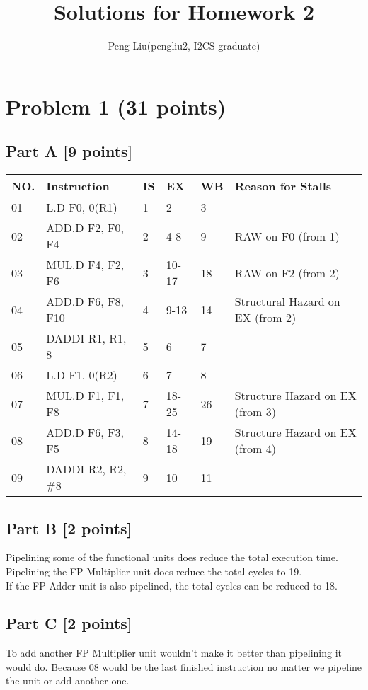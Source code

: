 \documentclass[11pt,leqno]{article}
\author{Peng Liu(pengliu2, I2CS graduate)}
\title{Solutions for Homework 2}
\begin{document}
\maketitle
\section*{Problem 1 (31 points)}
\subsection*{Part A [9 points]} 
\begin{tabular}{|l | l | l | l | l | l |}
  \hline
  NO.& Instruction      & IS    & EX    & WB    & Reason for Stalls\\
  \hline
  01 & L.D F0, 0(R1)    & 1     & 2     & 3     & \\
  \hline
  02 & ADD.D F2, F0, F4 & 2     & 4-8   & 9     & RAW on F0 (from 1)\\
  \hline
  03 & MUL.D F4, F2, F6 & 3     & 10-17  & 18    & RAW on F2 (from 2)\\
  \hline
  04 & ADD.D F6, F8, F10& 4     & 9-13  & 14    & Structural Hazard on EX (from 2)\\
  \hline
  05 & DADDI R1, R1, 8  & 5     & 6     & 7     & \\
  \hline
  06 & L.D F1, 0(R2)    & 6     & 7     & 8     & \\
  \hline
  07 & MUL.D F1, F1, F8 & 7     & 18-25 & 26    & Structure Hazard on EX (from 3)\\
  \hline
  08 & ADD.D F6, F3, F5 & 8     & 14-18 & 19    & Structure Hazard on EX (from 4)\\
  \hline
  09 & DADDI R2, R2, \#8& 9     & 10    & 11    & \\
  \hline
\end{tabular}

\subsection*{Part B [2 points]}
Pipelining some of the functional units does reduce the total execution time.\\
Pipelining the FP Multiplier unit does reduce the total cycles to 19.\\
If the FP Adder unit is also pipelined, the total cycles can be reduced to 18.

\subsection*{Part C [2 points]}
To add another FP Multiplier unit wouldn't make it better than pipelining it would do. Because 08 would be the last finished instruction no matter we pipeline the unit or add another one.
\end{document}
